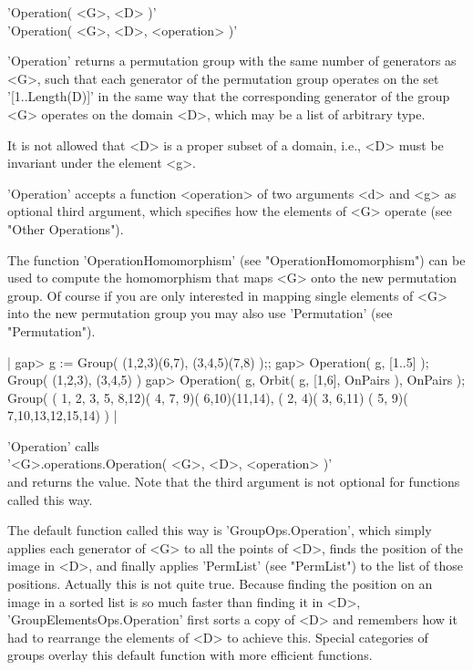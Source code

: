
'Operation( <G>, <D> )' \\
'Operation( <G>, <D>, <operation> )'

'Operation'  returns  a  permutation  group  with  the  same   number  of
generators  as  <G>, such that each generator  of  the permutation  group
operates  on  the  set  '[1..Length(D)]'  in   the   same  way  that  the
corresponding  generator of the  group <G> operates on  the  domain  <D>,
which may be a list of arbitrary type.

It is not allowed that <D> is a proper subset of a domain, i.e., <D> must
be invariant under the element <g>.

'Operation' accepts  a  function <operation> of two arguments <d> and <g>
as  optional  third  argument, which  specifies how  the elements  of <G>
operate (see "Other Operations").

The function 'OperationHomomorphism' (see "OperationHomomorphism") can be
used to  compute the homomorphism that  maps <G> onto the new permutation
group.  Of course  if you are  only interested in mapping single elements
of <G> into the new permutation group you may also use 'Permutation' (see
"Permutation").

|    gap> g := Group( (1,2,3)(6,7), (3,4,5)(7,8) );;
    gap> Operation( g, [1..5] );
    Group( (1,2,3), (3,4,5) )
    gap> Operation( g, Orbit( g, [1,6], OnPairs ), OnPairs );
    Group( ( 1, 2, 3, 5, 8,12)( 4, 7, 9)( 6,10)(11,14), ( 2, 4)( 3, 6,11)
    ( 5, 9)( 7,10,13,12,15,14) ) |

'Operation' calls \\
'<G>.operations.Operation( <G>, <D>, <operation> )' \\
and returns the value.  Note that the  third argument is not optional for
functions called this way.

The default function  called   this  way is  'GroupOps.Operation',  which
simply applies each generator of <G> to all the points of <D>,  finds the
position of  the  image in  <D>,  and   finally applies 'PermList'   (see
"PermList") to  the list of those positions.   Actually this is not quite
true.  Because  finding the  position on an image in  a sorted list is so
much  faster than  finding it in  <D>, 'GroupElementsOps.Operation' first
sorts a copy of <D> and remembers how it had to rearrange the elements of
<D> to achieve this.  Special  categories of groups overlay this  default
function with more efficient functions.

